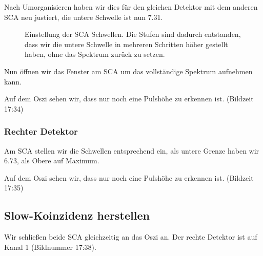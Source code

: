 Nach Umorganisieren haben wir dies für den gleichen Detektor mit dem
anderen SCA neu justiert, die untere Schwelle ist nun \num{7.31}.

\begin{figure}[htbp]
    \centering
    \label{mca:002}
    \caption{%
        Einstellung der SCA Schwellen. Die Stufen sind dadurch entstanden,
        dass wir die untere Schwelle in mehreren Schritten höher gestellt
        haben, ohne das Spektrum zurück zu setzen.
    }
\end{figure}

Nun öffnen wir das Fenster am SCA um das vollständige Spektrum aufnehmen kann.

Auf dem Oszi sehen wir, dass nur noch eine Pulshöhe zu erkennen ist. (Bildzeit
17:34)

\subsubsection{Rechter Detektor}

Am SCA stellen wir die Schwellen entsprechend ein, als untere Grenze haben wir
\num{6.73}, als Obere auf Maximum.

\begin{figure}[htbp]
    \centering
    \label{mca:006}
    \caption{}
\end{figure}

Auf dem Oszi sehen wir, dass nur noch eine Pulshöhe zu erkennen ist. (Bildzeit
17:35)

\subsection{Slow-Koinzidenz herstellen}

Wir schließen beide SCA gleichzeitig an das Oszi an. Der rechte Detektor ist
auf Kanal 1 (Bildnummer 17:38).

